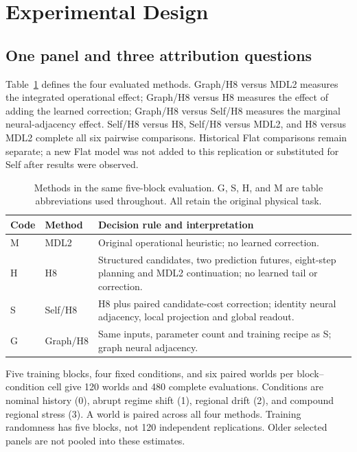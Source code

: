 \documentclass[preprint,12pt]{elsarticle}
\begin{document}
\section{Experimental Design}
\label{sec:design}
\subsection{One panel and three attribution questions}
Table~\ref{tab:methods} defines the four evaluated methods. Graph/H8 versus
MDL2 measures the integrated operational effect; Graph/H8 versus H8 measures
the effect of adding the learned correction; Graph/H8 versus Self/H8 measures
the marginal neural-adjacency effect. Self/H8 versus H8, Self/H8 versus MDL2,
and H8 versus MDL2 complete all six pairwise comparisons. Historical Flat
comparisons remain separate; a new Flat model was not added to this replication
or substituted for Self after results were observed.

\begin{table}[t]
\centering
\caption{Methods in the same five-block evaluation. G, S, H, and M are table
abbreviations used throughout. All retain the original physical task.}
\label{tab:methods}
\small
\begin{tabularx}{\textwidth}{l l X}
\toprule
Code & Method & Decision rule and interpretation\\
\midrule
M & MDL2 & Original operational heuristic; no learned correction.\\
H & H8 & Structured candidates, two prediction futures, eight-step
planning and MDL2 continuation; no learned tail or correction.\\
S & Self/H8 & H8 plus paired candidate-cost correction; identity neural
adjacency, local projection and global readout.\\
G & Graph/H8 & Same inputs, parameter count and training recipe as S;
graph neural adjacency.\\
\bottomrule
\end{tabularx}
\end{table}

Five training blocks, four fixed conditions, and six paired worlds per
block--condition cell give 120 worlds and 480 complete evaluations. Conditions
are nominal history (0), abrupt regime shift (1), regional drift (2), and compound
regional stress (3). A world is paired across all four methods. Training
randomness has five blocks, not 120 independent replications. Older selected
panels are not pooled into these estimates.
\end{document}
